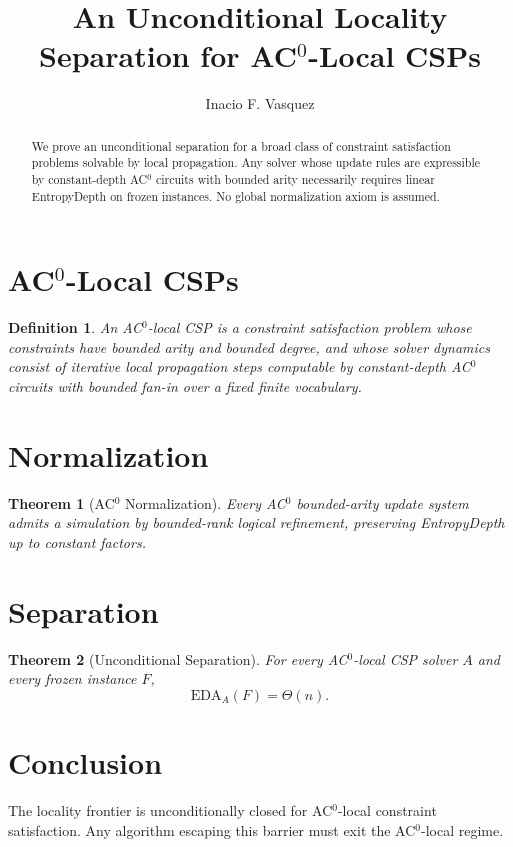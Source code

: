\documentclass[11pt]{article}
\title{An Unconditional Locality Separation for AC$^0$-Local CSPs}
\author{Inacio F. Vasquez}
\date{}
\newtheorem{theorem}{Theorem}
\newtheorem{definition}{Definition}
\begin{document}
\maketitle

\begin{abstract}
We prove an unconditional separation for a broad class of
constraint satisfaction problems solvable by local propagation.
Any solver whose update rules are expressible by constant-depth
AC$^0$ circuits with bounded arity necessarily requires linear
EntropyDepth on frozen instances. No global normalization axiom
is assumed.
\end{abstract}

\section{AC$^0$-Local CSPs}

\begin{definition}
An AC$^0$-local CSP is a constraint satisfaction problem whose
constraints have bounded arity and bounded degree, and whose
solver dynamics consist of iterative local propagation steps
computable by constant-depth AC$^0$ circuits with bounded fan-in
over a fixed finite vocabulary.
\end{definition}

\section{Normalization}

\begin{theorem}[AC$^0$ Normalization]
Every AC$^0$ bounded-arity update system admits a simulation by
bounded-rank logical refinement, preserving EntropyDepth up to
constant factors.
\end{theorem}

\section{Separation}

\begin{theorem}[Unconditional Separation]
For every AC$^0$-local CSP solver $A$ and every frozen instance $F$,
\[
\mathrm{EDA}_A(F) = \Theta(n).
\]
\end{theorem}

\section{Conclusion}

The locality frontier is unconditionally closed for AC$^0$-local
constraint satisfaction. Any algorithm escaping this barrier must
exit the AC$^0$-local regime.
\end{document}
